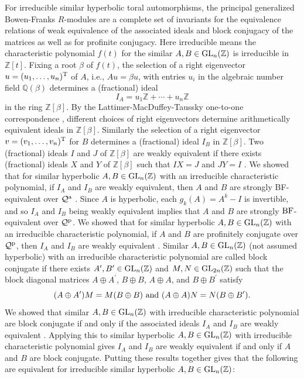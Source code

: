 \documentclass{amsart}
\theoremstyle{plain}
\theoremstyle{definition}
\theoremstyle{remark}
\begin{document}
For irreducible similar hyperbolic toral automorphisms, the principal generalized Bowen-Franks $R$-modules are a complete set of invariants for the equivalence relations of weak equivalence of the associated ideals and block conjugacy of the matrices as well as for profinite conjugacy. Here irreducible means the characteristic polynomial $f(t)$ for the similar $A,B\in {\rm GL}_n({\mathbb Z})$ is irreducible in ${\mathbb Z}[t]$. Fixing a root $\beta$ of $f(t)$, the selection of a right eigenvector $u = (u_1,\dots,u_n)^{\rm T}$ of $A$, i.e., $Au = \beta u$, with entries $u_i$ in the algebraic number field ${\mathbb Q}(\beta)$ determines a (fractional) ideal 
\[ I_A = u_1{\mathbb Z} + \cdots + u_n {\mathbb Z}\]
in the ring ${\mathbb Z}[\beta]$. By the Lattimer-MacDuffey-Taussky one-to-one correspondence \cite{LM33,Ta78}, different choices of right eigenvectors determine arithmetically equivalent ideals in ${\mathbb Z}[\beta]$. Similarly the selection of a right eigenvector $v = (v_1,\dots,v_n)^{\rm T}$ for $B$ determines a (fractional) ideal $I_B$ in ${\mathbb Z}[\beta]$. Two (fractional) ideals $I$ and $J$ of ${\mathbb Z}[\beta]$ are weakly equivalent if there exists (fractional) ideals $X$ and $Y$ of ${\mathbb Z}[\beta]$ such that $IX = J$ and $JY = I$ \cite{DTZ62}. We showed that for similar hyperbolic $A,B\in {\rm GL}_n({\mathbb Z})$ with an irreducible characteristic polynomial, if $I_A$ and $I_B$ are weakly equivalent, then $A$ and $B$ are strongly {\rm BF}-equivalent over ${\mathcal Q}^{\rm a}$ \cite{BM12}. Since $A$ is hyperbolic, each $g_k(A) = A^k-I$ is invertible, and so $I_A$ and $I_B$ being weakly equivalent implies that $A$ and $B$ are strongly ${\rm BF}$-equivalent over ${\mathcal Q}^{\rm p}$. We showed that for similar hyperbolic $A,B\in {\rm GL}_n({\mathbb Z})$ with an irreducible characteristic polynomial, if $A$ and $B$ are profinitely conjugate over ${\mathcal Q}^{\rm p}$, then $I_A$ and $I_B$ are weakly equivalent \cite{BMM16}. Similar $A,B\in {\rm GL}_n({\mathbb Z})$ (not assumed hyperbolic) with an irreducible characteristic polynomial are called block conjugate if there exists $A^\prime,B^\prime \in {\rm GL}_n({\mathbb Z})$ and $M,N\in {\rm GL}_{2n}({\mathbb Z})$ such that the block diagonal matrices $A\oplus A^\prime$, $B\oplus B$, $A\oplus A$, and $B\oplus B^\prime$ satisfy
\[ (A\oplus A^\prime)M = M(B\oplus B) {\rm\ and \ }(A\oplus A)N = N(B\oplus B^\prime).\]
We showed that similar $A,B\in {\rm GL}_n({\mathbb Z})$ with irreducible characteristic polynomial are block conjugate if and only if the associated ideals $I_A$ and $I_B$ are weakly equivalent \cite{BM19}. Applying this to similar hyperbolic $A,B\in {\rm GL}_n({\mathbb Z})$ with irreducible characteristic polynomial gives $I_A$ and $I_B$ are weakly equivalent if and only if $A$ and $B$ are block conjugate. Putting these results together gives that the following are equivalent for irreducible similar hyperbolic $A,B\in {\rm GL}_n({\mathbb Z})$:
\end{document}

